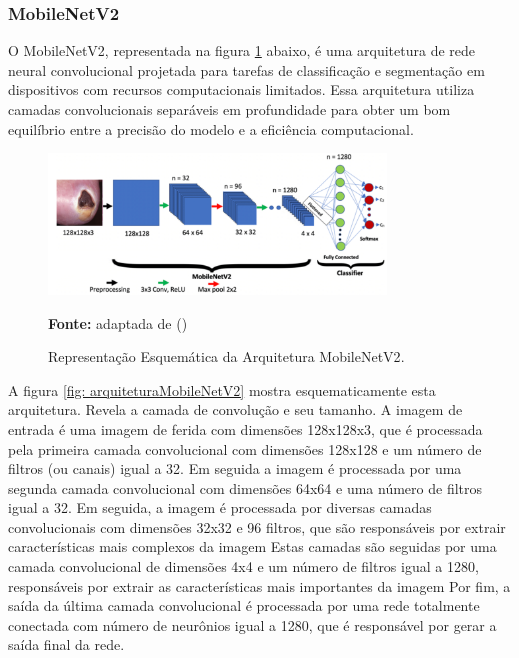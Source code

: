     \clearpage
    
    \subsubsection{MobileNetV2}

        O \ac{MobileNetV2}, representada na figura \ref{fig:arquiteturaMobileNetV2} abaixo, é uma arquitetura de rede neural convolucional projetada para tarefas de classificação e segmentação em dispositivos com recursos computacionais limitados. Essa arquitetura utiliza camadas convolucionais separáveis em profundidade para obter um bom equilíbrio entre a precisão do modelo e a eficiência computacional.
    
            \begin{figure}[htbp]
                \centering
                \caption{Representação Esquemática da Arquitetura \ac{MobileNetV2}.}
                \includegraphics[width=0.8\textwidth]{img/arquitetura_MobileNetV2.png}
                \label{fig:arquiteturaMobileNetV2}
                \par\medskip\textbf{Fonte:} adaptada de (\cite{akay2021deep})
            \end{figure}   
    
        A figura \ref{fig: arquiteturaMobileNetV2} mostra esquematicamente esta arquitetura. Revela a camada de convolução e seu tamanho. A imagem de entrada é uma imagem de ferida com dimensões 128x128x3, que é processada pela primeira camada convolucional com dimensões 128x128 e um número de filtros (ou canais) igual a 32. Em seguida a imagem é processada por uma segunda camada convolucional com dimensões 64x64 e uma número de filtros igual a 32. Em seguida, a imagem é processada por diversas camadas convolucionais com dimensões 32x32 e 96 filtros, que são responsáveis por extrair características mais complexos da imagem Estas camadas são seguidas por uma camada convolucional de dimensões 4x4 e um número de filtros igual a 1280, responsáveis por extrair as características mais importantes da imagem Por fim, a saída da última camada convolucional é processada por uma rede totalmente conectada com número de neurônios igual a 1280, que é responsável por gerar a saída final da rede.

